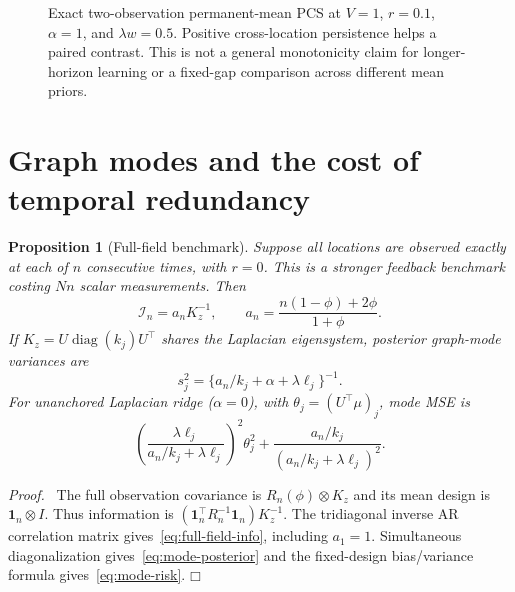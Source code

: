 \documentclass[11pt]{article}
\newtheorem{proposition}[theorem]{Proposition}
\newenvironment{proof}{\par\noindent\textit{Proof.}\ }{\hfill$\mdlgwhtsquare$\par\medskip}
\newcommand{\one}{\mathbf1}
\begin{document}
\begin{figure}[t]
\centering
{}
\caption{Exact two-observation permanent-mean PCS at $V=1$, $r=0.1$, $\alpha=1$, and $\lambda w=0.5$. Positive cross-location persistence helps a paired contrast. This is not a general monotonicity claim for longer-horizon learning or a fixed-gap comparison across different mean priors.}
\label{fig:two-pcs}
\end{figure}

\section{Graph modes and the cost of temporal redundancy}
\begin{proposition}[Full-field benchmark]
Suppose all locations are observed exactly at each of $n$ consecutive times, with $r=0$. This is a stronger feedback benchmark costing $Nn$ scalar measurements. Then
\begin{equation}
\mathcal I_n=a_nK_z^{-1},\qquad
\boxed{a_n=\frac{n(1-\phi)+2\phi}{1+\phi}.}
\label{eq:full-field-info}
\end{equation}
If $K_z=U\operatorname{diag}(k_j)U^\top$ shares the Laplacian eigensystem, posterior graph-mode variances are
\begin{equation}
\boxed{s_j^2=\{a_n/k_j+\alpha+\lambda\ell_j\}^{-1}.}
\label{eq:mode-posterior}
\end{equation}
For unanchored Laplacian ridge ($\alpha=0$), with $\theta_j=(U^\top\mu)_j$, mode MSE is
\begin{equation}
\left(\frac{\lambda\ell_j}{a_n/k_j+\lambda\ell_j}\right)^2\theta_j^2
+\frac{a_n/k_j}{(a_n/k_j+\lambda\ell_j)^2}.
\label{eq:mode-risk}
\end{equation}
\end{proposition}
\begin{proof}
The full observation covariance is $R_n(\phi)\otimes K_z$ and its mean design is $\one_n\otimes I$. Thus information is $(\one_n^\top R_n^{-1}\one_n)K_z^{-1}$. The tridiagonal inverse AR correlation matrix gives~\eqref{eq:full-field-info}, including $a_1=1$. Simultaneous diagonalization gives~\eqref{eq:mode-posterior} and the fixed-design bias/variance formula gives~\eqref{eq:mode-risk}.
\end{proof}
\end{document}
